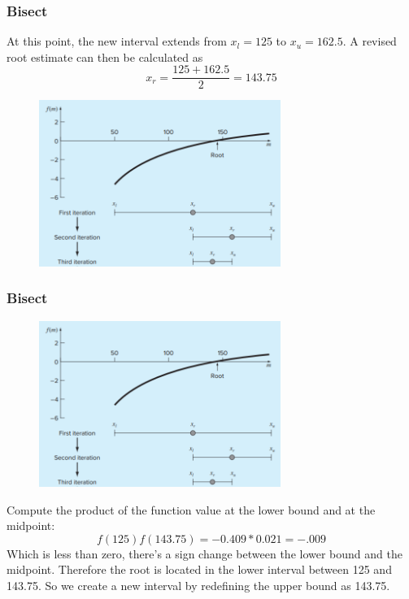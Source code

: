 \documentclass{if-beamer}
\begin{document}
\begin{frame}
\frametitle{Bisect}
At this point, the new interval extends from $x_l = 125$ to $x_u = 162.5$. A revised root estimate can then be calculated as
$$ x_r = \frac{125+162.5}{2} = 143.75$$
\begin{figure}
\center
\includegraphics[width=0.7\textwidth]{figures/bracket3.png}
\end{figure}
\end{frame}


\begin{frame}
\frametitle{Bisect}
\begin{figure}
	\center
	\includegraphics[width=0.7\textwidth]{figures/bracket3.png}
\end{figure}
Compute the product of the function value at the lower bound and at the midpoint:
$$f(125)f(143.75) = -0.409*0.021 = -.009 $$ 
Which is less than zero, there's a sign change between the lower bound and the midpoint. Therefore the root is located in the lower interval between 125 and 143.75. So we create a new interval by redefining the upper bound as 143.75.
\end{frame}
\end{document}
